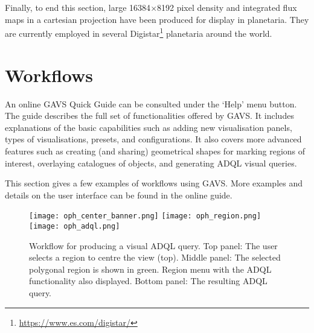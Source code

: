 \documentclass[longauth, final]{aa}
\def\blue#1{\textcolor{blue}{#1}}
\begin{document}

Finally, to end this section, large 16384$\times$8192 pixel density and integrated flux maps in a cartesian projection have been produced for display in planetaria. They are currently employed in several Digistar\footnote{\url{https://www.es.com/digistar/}} planetaria around the world.



\section{ Workflows}
\label{sec:workflows}

An online GAVS Quick Guide can be consulted under the `Help' menu button. The guide describes the full set of functionalities offered by GAVS. It includes explanations of the basic capabilities such as adding new visualisation panels, types of visualisations, presets, and configurations. It also covers more advanced features such as creating (and sharing) geometrical shapes for marking regions of interest, overlaying catalogues of objects, and generating ADQL visual queries.

This section gives a few  examples of workflows using GAVS. More examples and details on the user interface can be found  in the online guide.

\begin{figure}[!htbp]
\centering
    \texttt{[image: oph\_center\_banner.png]}
    \texttt{[image: oph\_region.png]}\\
    \texttt{[image: oph\_adql.png]}
  \caption{Workflow for producing a  visual ADQL query. Top panel: The user selects a region to centre the view (top). Middle panel: The selected polygonal region is shown in green. Region menu with the ADQL functionality also displayed. Bottom panel: The resulting ADQL query.}\label{fig:adql_oph}
\end{figure}

\end{document}

